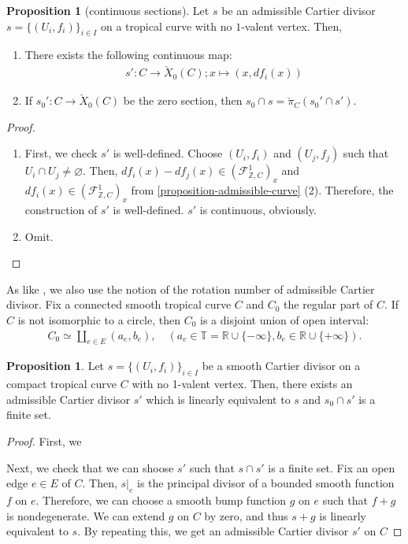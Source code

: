 \documentclass[a4paper,dvipdfmx,reqno,12pt]{amsart}
\theoremstyle{definition}
\newtheorem{proposition}[theorem]{Proposition}
\newcommand{\emp}{\varnothing}%
\numberwithin{equation}{section}
\begin{document}
\begin{proposition}[{continuous sections}]
\label{proposition-admissible-section}
Let $s$ be an admissible Cartier divisor 
$s=\{(U_i,f_i)\}_{i\in I}$ on a tropical curve with 
no $1$-valent vertex. 
Then, 
\begin{enumerate}
\item There exists the following continuous map:
\begin{align}
s'\colon C\to \check{X}_0 (C); x\mapsto (x,df_{i}(x))
\end{align}
\item If $s_0'\colon C\to \check{X}_0 (C)$ be the 
zero section, then $s_0\cap s=\check{\pi}_C(s_0'\cap s')$.
\end{enumerate}
\end{proposition}
\begin{proof}
\begin{enumerate}
\item First, we check $s'$ is well-defined.
Choose $(U_i,f_i)$ and $(U_j,f_j)$ such that
$U_i\cap U_j\neq \emp$. 
Then, $df_i(x)-df_j(x)\in 
(\mathcal{F}_{\mathbb{Z},C}^{1})_x$ and
$df_i(x)\in (\mathcal{F}_{\mathbb{Z},C}^{1})_x$
from \cref{proposition-admissible-curve} (2).
Therefore, the construction of $s'$ is well-defined.
$s'$ is continuous, obviously.
\item Omit.
\end{enumerate}
\end{proof}


As like \cite{auroux2022lagrangian},
we also use the notion of the rotation number of 
admissible Cartier divisor.
Fix a connected smooth tropical curve $C$
 and $C_0$ the 
regular part of $C$.
If $C$ is not isomorphic to a circle, then
$C_0$ is a disjoint union of open interval:
\begin{align}
  C_0\simeq \coprod_{e\in E} (a_e,b_e), \quad
(a_e\in \mathbb{T}
=\mathbb{R}\cup\{-\infty\}, b_e\in \mathbb{R}\cup\{+\infty\}).
\end{align}

\begin{proposition}
Let $s=\{(U_i,f_i)\}_{i\in I}$ be a smooth Cartier divisor on a compact
tropical curve $C$ with no 1-valent vertex.
Then, there exists
an admissible Cartier divisor $s'$ which is linearly
equivalent to $s$ and
$s_0\cap s'$ is a finite set. 
\end{proposition}
\begin{proof}

First, we 

Next, we check that we can shoose $s'$ 
such that $s\cap s'$ is a finite set.
Fix an open edge $e \in E$ of $C$.
Then, $s|_e$ is the principal divisor of a bounded smooth 
function $f$ on $e$. 
Therefore, we can choose a smooth bump function $g$ on $e$ such 
that $f+g$ is nondegenerate. We can extend $g$ on $C$ 
by zero, and thus $s+g$ is linearly equivalent to $s$.
By repeating this, we get an admissible Cartier divisor
$s'$ on $C$
\end{proof}
\end{document}
